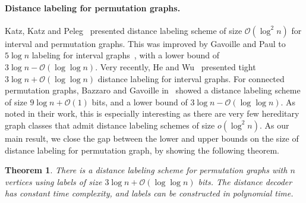 \documentclass[a4paper,11pt]{article}
\newcommand{\Oh}{\mathcal{O}}
\newtheorem{theorem}{Theorem}
\begin{document}
\paragraph{Distance labeling for permutation graphs.}
Katz, Katz and Peleg~\cite{KatzKP05} presented distance labeling scheme of size $\Oh(\log^2{n})$
for interval and permutation graphs.
This was improved by Gavoille and Paul to $5\log{n}$ labeling for interval graphs~\cite{GavInterval},
with a lower bound of $3\log{n}-\Oh(\log\log n)$.
Very recently, He and Wu~\cite{HeW24} presented tight $3\log{n}+\Oh(\log{\log{n}})$ distance labeling for interval graphs.
For connected permutation graphs, Bazzaro and Gavoille in~\cite{BazzaroG05} showed a distance labeling scheme of size $9\log{n}+\Oh(1)$ bits,
and a lower bound of $3\log{n}-\Oh(\log\log n)$.
As noted in their work, this is especially interesting as there are very few hereditary graph classes that admit
distance labeling schemes of size $o(\log^2{n})$.
As our main result, we close the gap between the lower and upper bounds on the size of distance labeling for
permutation graph, by showing the following theorem.

\begin{theorem}
There is a distance labeling scheme for permutation graphs with $n$ vertices using labels of size $3\log{n}+\Oh(\log{\log{n}})$ bits.
The distance decoder has constant time complexity, and labels can be constructed in polynomial time.
\label{Th:Main}
\end{theorem}
\end{document}
